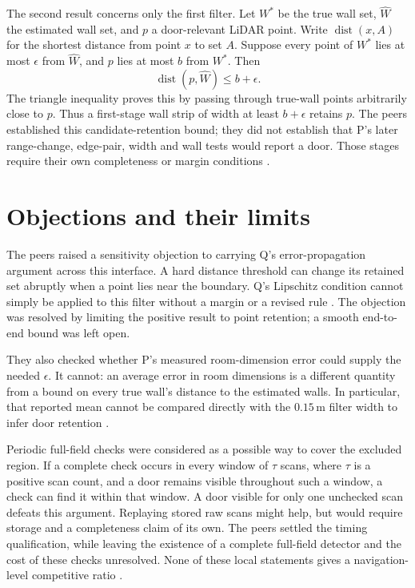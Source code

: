 \documentclass{article}
\begin{document}
The second result concerns only the first filter. Let \(W^*\) be the true wall set, \(\widehat W\)
the estimated wall set, and \(p\) a door-relevant LiDAR point. Write \(\operatorname{dist}(x,A)\)
for the shortest distance from point \(x\) to set \(A\). Suppose every point of \(W^*\) lies at most
\(\epsilon\) from \(\widehat W\), and \(p\) lies at most \(b\) from \(W^*\). Then
\[
\operatorname{dist}(p,\widehat W)\leq b+\epsilon.
\]
The triangle inequality proves this by passing through true-wall points arbitrarily close to \(p\).
Thus a first-stage wall strip of width at least \(b+\epsilon\) retains \(p\). The peers established
this candidate-retention bound; they did not establish that P's later range-change, edge-pair, width
and wall tests would report a door. Those stages require their own completeness or margin conditions
\cite{P}.

\section{Objections and their limits}

The peers raised a sensitivity objection to carrying Q's error-propagation argument across this
interface. A hard distance threshold can change its retained set abruptly when a point lies near the
boundary. Q's Lipschitz condition cannot simply be applied to this filter without a margin or a
revised rule \cite{Q}. The objection was resolved by limiting the positive result to point
retention; a smooth end-to-end bound was left open.

They also checked whether P's measured room-dimension error could supply the needed \(\epsilon\). It
cannot: an average error in room dimensions is a different quantity from a bound on every true
wall's distance to the estimated walls. In particular, that reported mean cannot be compared
directly with the \(0.15\,\mathrm{m}\) filter width to infer door retention \cite{P}.

Periodic full-field checks were considered as a possible way to cover the excluded region. If a
complete check occurs in every window of \(\tau\) scans, where \(\tau\) is a positive scan count,
and a door remains visible throughout such a window, a check can find it within that window. A door
visible for only one unchecked scan defeats this argument. Replaying stored raw scans might help,
but would require storage and a completeness claim of its own. The peers settled the timing
qualification, while leaving the existence of a complete full-field detector and the cost of these
checks unresolved. None of these local statements gives a navigation-level competitive ratio
\cite{Q,P}.
\end{document}
